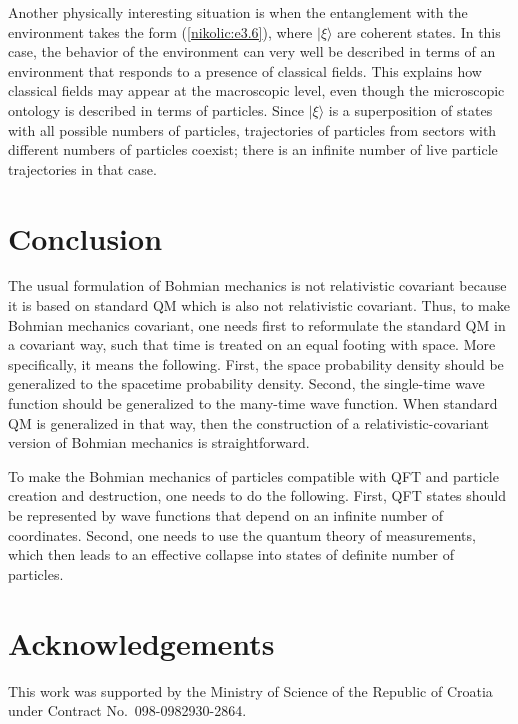\documentclass[12pt,twoside]{report} %
\begin{document}
Another physically interesting situation is when the entanglement with the environment
takes the form (\ref{nikolic:e3.6}), where $|\xi\rangle$ are coherent states. 
In this case, the behavior of the environment can very well be described in terms 
of an environment that responds to a presence of classical fields.
This explains how classical fields may appear at the
macroscopic level, even though the microscopic ontology is described
in terms of particles. 
Since $|\xi\rangle$ is a superposition of states with all possible numbers of particles,
trajectories of particles from sectors with different numbers of particles coexist;
there is an infinite number of live particle trajectories in that case. 

\section{Conclusion}

The usual formulation of Bohmian mechanics is not relativistic covariant because 
it is based on standard QM which is also not relativistic covariant.
Thus, to make  Bohmian mechanics covariant, one needs
first to reformulate the standard QM in a covariant way, such that
time is treated on an equal footing with space. More specifically, it means the following. First, 
the space probability density should be generalized to the spacetime probability density.
Second, the single-time wave function should be generalized to the many-time wave function.
When standard QM is generalized in that way, then the construction
of a relativistic-covariant version of Bohmian mechanics is straightforward.

To make the Bohmian mechanics of particles compatible with QFT and particle creation and destruction,
one needs to do the following. First, QFT states should be represented by wave functions
that depend on an infinite number of coordinates. Second, one needs to
use the quantum theory of measurements, which then leads to
an effective collapse into states of definite number of particles.



\section*{Acknowledgements}


This work was supported by the Ministry of Science of the
Republic of Croatia under Contract No.~098-0982930-2864.
\end{document}
